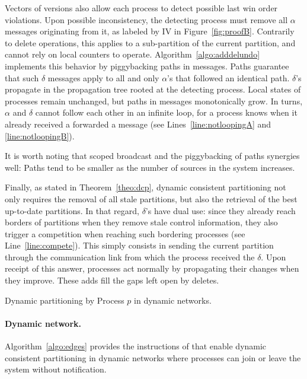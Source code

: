 Vectors of versions also allow each process to detect possible last
win order violations. Upon possible inconsistency, the detecting
process must remove all $\alpha$ messages originating from it, as
labeled by IV in Figure~\ref{fig:proofB}. Contrarily to delete
operations, this applies to a sub-partition of the current partition,
and cannot rely on local counters to
operate. Algorithm~\ref{algo:adddelundo} implements this behavior by
piggybacking paths in messages. Paths guarantee that such $\delta$
messages apply to all and only $\alpha$'s that followed an identical
path. $\delta$'s propagate in the propagation tree rooted at the
detecting process. Local states of processes remain unchanged, but
paths in messages monotonically grow. In turns, $\alpha$ and $\delta$
cannot follow each other in an infinite loop, for a process knows when
it already received a forwarded a message (see
Lines~\ref{line:notloopingA} and \ref{line:notloopingB}).

\noindent It is worth noting that scoped broadcast and the
piggybacking of paths synergies well: Paths tend to be smaller as the
number of sources in the system increases.

Finally, as stated in Theorem~\ref{theo:dcp}, dynamic consistent
partitioning not only requires the removal of all stale partitions,
but also the retrieval of the best up-to-date partitions. In that
regard, $\delta$'s have dual use: since they already reach borders of
partitions when they remove stale control information, they also
trigger a competition when reaching such bordering processes (see
Line~\ref{line:compete}). This simply consists in sending the current
partition through the communication link from which the process
received the $\delta$. Upon receipt of this answer, processes act
normally by propagating their changes when they improve. These adds
fill the gaps left open by deletes.

\begin{algorithm}
  
  \caption{\label{algo:edges}Dynamic partitioning by Process $p$ in dynamic networks.}
\end{algorithm}

\paragraph{Dynamic network.}
Algorithm~\ref{algo:edges} provides the instructions of \NAME that
enable dynamic consistent partitioning in dynamic networks where
processes can join or leave the system without
notification. 

